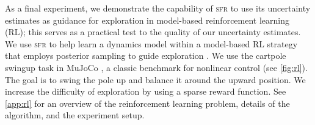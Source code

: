 \documentclass{article} %
\newcommand{\our}{\textsc{sfr}\xspace}
\begin{document}

\newcommand{\lab}[1]{\protect\tikz[baseline=-.5ex]{\protect\node[minimum width=1.5em,minimum height=.8em,fill=#1,opacity=.1](a){};\protect\draw[#1,semithick](a.west)--(a.east);}}




As a final experiment, we demonstrate the capability of \our to use its uncertainty estimates as guidance for exploration in model-based reinforcement learning (RL); this serves as a practical test to the quality of our uncertainty estimates. We use \our to help learn a dynamics model within a model-based RL strategy that employs posterior sampling to guide exploration \cite{osbandMoreEfficientReinforcement2013,osbandWhyPosteriorSampling2017}.
%
We use the cartpole swingup task in MuJoCo \cite{todorov2012mujoco}, a classic benchmark for nonlinear control (see \cref{fig:rl}).
The goal is to swing the pole up and balance it around the upward position.
We increase the difficulty of exploration by using a sparse reward function.
See \cref{app:rl} for an overview of the reinforcement learning problem, details of the algorithm, and the experiment setup.
\end{document}
